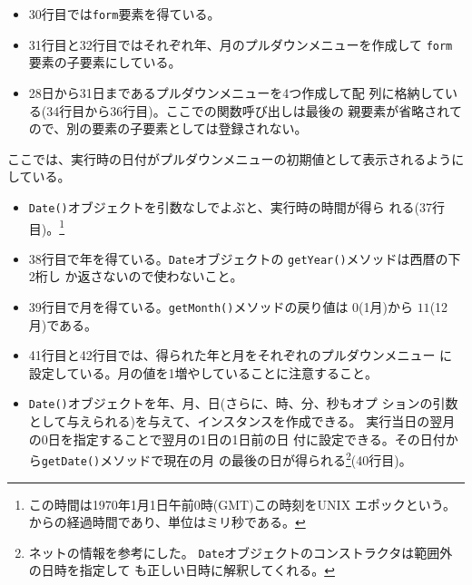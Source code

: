 \begin{Exec}
\begin{itemize}
 \item 30行目では\texttt{form}要素を得ている。
 \item 31行目と32行目ではそれぞれ年、月のプルダウンメニューを作成して
       \texttt{form}要素の子要素にしている。
 \item 28日から31日まであるプルダウンメニューを4つ作成して配
       列に格納している(34行目から36行目)。ここでの関数呼び出しは最後の
       親要素が省略されてので、別の要素の子要素としては登録されない。
\end{itemize}
ここでは、実行時の日付がプルダウンメニューの初期値として表示されるように
 している。
\begin{itemize}
 \item \texttt{Date()}オブジェクトを引数なしでよぶと、実行時の時間が得ら
       れる(37行目)。\footnote{この時間は1970年1月1日午前0時(GMT)この時刻をUNIX
       エポックという。 からの経過時間であり、単位はミリ秒である。}
 \item 38行目で年を得ている。\texttt{Date}オブジェクトの
       \texttt{getYear()}メソッドは西暦の下2桁し
       か返さないので使わないこと。
 \item 39行目で月を得ている。\texttt{getMonth()}メソッドの戻り値は
       $0$(1月)から $11$(12月)である。
 \item 41行目と42行目では、得られた年と月をそれぞれのプルダウンメニュー
       に設定している。月の値を1増やしていることに注意すること。
 \item \texttt{Date()}オブジェクトを年、月、日(さらに、時、分、秒もオプ
       ションの引数として与えられる)を与えて、インスタンスを作成できる。
       実行当日の翌月の0日を指定することで翌月の1日の1日前の日
       付に設定できる。その日付から\texttt{getDate()}メソッドで現在の月
       の最後の日が得られる\footnote{ネットの情報を参考にした。
       \texttt{Date}オブジェクトのコンストラクタは範囲外の日時を指定して
       も正しい日時に解釈してくれる。}(40行目)。
       

\end{itemize}
\end{Exec}
